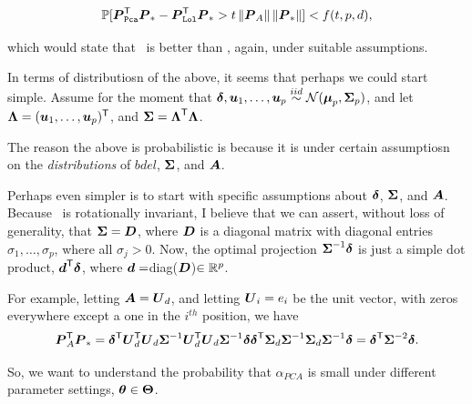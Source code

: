 \documentclass[10pt]{article}
\begin{document}
\begin{thm}
\begin{align*}
\mathbb{P}[ \boldsymbol{P}_{{\sc \texttt{Pca}}} ^{\mathsf{T}} \boldsymbol{P}_*  - \boldsymbol{P}_{{\sc \texttt{Lol}}} ^{\mathsf{T}} \boldsymbol{P}_*  > t \left \lVert\boldsymbol{P}_A \right \rVert \left \lVert\boldsymbol{P}_* \right \rVert ] < f(t,p,d),
\end{align*}
\end{thm}
which would state that \Lol~is better than \Pca, again, under suitable assumptions.

In terms of distributiosn of the above, it seems that perhaps we could start simple.
Assume for the moment that $\boldsymbol{\delta},\boldsymbol{u}_1,\ldots,\boldsymbol{u}_p \overset{iid}{\sim} \mathcal{N}(\boldsymbol{\mu}_p, \boldsymbol{\Sigma}_p)$, and let $\boldsymbol{\Lambda}=(\boldsymbol{u}_1,\ldots,\boldsymbol{u}_p)^{\mathsf{T}}$, and $\boldsymbol{\Sigma} = \boldsymbol{\Lambda}^{\mathsf{T}} \boldsymbol{\Lambda}$.  

The reason the above is probabilistic is because it is under certain assumptiosn on the \emph{distributions} of $bdel$, $\boldsymbol{\Sigma}$, and $\boldsymbol{A}$.   


Perhaps even simpler is to start with specific assumptions about $\boldsymbol{\delta}$, $\boldsymbol{\Sigma}$, and $\boldsymbol{A}$. Because \Fld~is rotationally invariant, I believe that we can assert, without loss of generality, that $\boldsymbol{\Sigma}=\boldsymbol{D}$, where $\boldsymbol{D}$ is a diagonal matrix with diagonal entries $\sigma_1,\ldots, \sigma_p$, where all $\sigma_j > 0$.
Now, the optimal projection $\boldsymbol{\Sigma}^{-1} \boldsymbol{\delta}$ is just a simple dot product,  $\boldsymbol{d}^{\mathsf{T}} \boldsymbol{\delta}$, where $\boldsymbol{d}=$diag($\boldsymbol{D}$)$\in \mathbb{R}^p$.


For example, letting $\boldsymbol{A}=\boldsymbol{U}_d$, and letting $\boldsymbol{U}_i=e_i$ be the unit vector, with zeros everywhere except a one in the $i^{th}$ position,  we have
\begin{align*}
\bP_A\T \bP_* %
= \bdel\T \bU_d\T \bU_d \bSig^{-1} \bU_d\T \bU_d \bSig^{-1} \bdel %
\bdel\T \bSig_d \bSig^{-1} \bSig_d \bSig^{-1} \bdel %
= \bdel\T \bSig^{-2} \bdel.
\end{align*}






So, we want to understand the probability that $\alpha_{PCA}$ is small under different parameter settings, $\boldsymbol{\theta} \in \boldsymbol{\Theta}$.  


\end{document}

